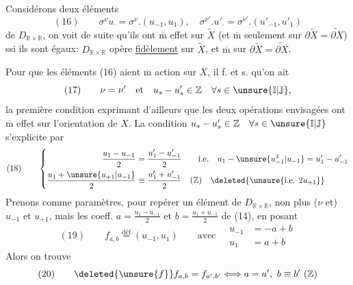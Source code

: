 Considérons deux éléments
\[
(16)\qquad \sigma^\nu u_\cdot=\sigma^\nu.(u_{-1},u_1),\quad\sigma^{\nu'}.u'_\cdot=\sigma^{\nu'}.(u'_{-1},u'_1)
\]
de $D_{\mathbb R\times\mathbb R}$, on voit de suite qu'ils ont $\overline{\mathrm m}$ effet sur $\widetilde X$  (et $\overline{\mathrm m}$ seulement sur $\partial\widetilde X=\widetilde{\partial X}$) ssi ils sont égaux: $D_{\mathbb R\times\mathbb R}$ opère \uline{fidèlement} sur $\widetilde X$, et $\overline{\mathrm m}$ sur $\partial\widetilde X=\widetilde{\partial X}$.

Pour que les éléments (16) aient $\overline{\mathrm m}$ action sur $X$, il f. et s. qu'on ait
\[
(17)\qquad \nu=\nu'\quad\text{et}\quad u_s-u'_s\in\mathbb Z\quad\forall s\in\unsure{\mathbb I|\mathbb J},
\]
la première condition  exprimant d'ailleurs que les deux opérations envisagées ont $\overline{\mathrm m}$ effet sur l'orientation de $X$. La condition $u_s-u'_s\in\mathbb Z\quad\forall s\in\unsure{\mathbb I|\mathbb J}$ s'explicite par
\[
(18)\qquad\left\{\begin{aligned}
\frac{u_1-u_{-1}}2&=\frac{u'_1-u'_{-1}}2\qquad\text{i.e.}\quad u_1-\unsure{u_{-1}^{4}|u_{-1}}=u'_1-u'_{-1}\\
\frac{u_1+\unsure{u_{+1}|u_{-1}}}2&\equiv\frac{u'_1+u'_{-1}}2\quad(\mathbb Z)\quad\deleted{\unsure{\text{i.e. }2u_{+1}}}
\end{aligned}\right.
\]
 Prenons comme paramètres, pour repérer un élément  de $D_{\mathbb R\times\mathbb R}$, non plus ($\nu$ et) $u_{-1}$ et $u_{+1}$, mais les coeff. $a=\frac{u_1-u_{-1}}2$ et $b=\frac{u_1+u_{-1}}2$ de (14), en posant
\[
(19)\qquad f_{a,b}\overset{\text{déf}}{=}(u_{-1},u_1)\qquad\text{avec}\quad\begin{aligned}u_{-1}&=-a+b\\u_1&=a+b\end{aligned}
\]
Alors on trouve
\[
(20)\qquad\deleted{\unsure{f}}f_{a,b}=f_{a',b'}\Longleftrightarrow a=a',\ b\equiv b'\ (\mathbb Z)
\]
